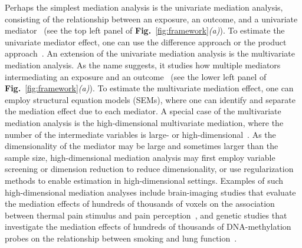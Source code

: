 \documentclass[
  12pt]{article}
\begin{document}
Perhaps the simplest mediation analysis is the univariate mediation analysis, consisting of the relationship between an exposure, an outcome, and a univariate mediator~\citep{baron1986moderator, robins1992identifiability} (see the top left panel of \textbf{Fig.}~\ref{fig:framework}\textit{(a)}). To estimate the univariate mediator effect, one can use the difference approach or the product approach~\citep{vanderweele2016mediation}. An extension of the univariate mediation analysis is the multivariate mediation analysis. As the name suggests, it studies how multiple mediators intermediating an exposure and an outcome~\citep{lindquist2012functional, vanderweele2014mediation} (see the lower left panel of \textbf{Fig.}~\ref{fig:framework}\textit{(a)}). To estimate the multivariate mediation effect, one can employ structural equation models (SEMs), where one can identify and separate the mediation effect due to each mediator. A special case of the multivariate mediation analysis is the high-dimensional multivariate mediation, where the number of the intermediate variables is large- or high-dimensional~\citep{huang2016hypothesis, zhang2016estimating, chen2018high, song2020bayesian, zhao2020sparse, hu2024high, cui2024mediation}. As the dimensionality of the mediator may be large and sometimes larger than the sample size, high-dimensional mediation analysis may first employ variable screening or dimension reduction to reduce dimensionality, or use regularization methods to enable estimation in high-dimensional settings. Examples of such high-dimensional mediation analyses include brain-imaging studies that evaluate the mediation effects of hundreds of thousands of voxels on the association between thermal pain stimulus and pain perception~\citep{chen2018high}, and genetic studies that investigate the mediation effects of hundreds of thousands of DNA-methylation probes on the relationship between smoking and lung function~\citep{zhang2016estimating}.
\end{document}
